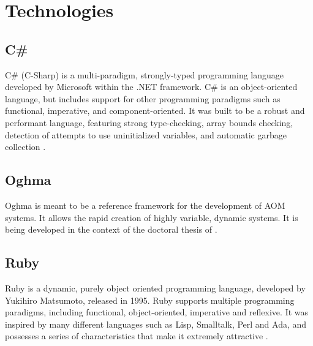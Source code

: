 \chapter{Technologies}\label{chap:technologies}

\section{C\#}\label{sec:csharp}

C\# (C-Sharp) is a multi-paradigm, strongly-typed programming language developed by Microsoft within the .NET framework. C\# is an object-oriented language, but includes support for other programming paradigms such as functional, imperative, and component-oriented. It was built to be a robust and performant language, featuring strong type-checking, array bounds checking, detection of attempts to use uninitialized variables, and automatic garbage collection \cite{csharp}.

\section{Oghma}\label{sec:oghma}


Oghma is meant to be a reference framework for the development of AOM systems. It allows the rapid creation of highly variable, dynamic systems. It is being developed in the context of the doctoral thesis of \cite{hugo_ferreira}.

\section{Ruby}\label{sec:technologies:ruby}

Ruby is a dynamic, purely object oriented programming language, developed by Yukihiro Matsumoto, released in 1995. Ruby supports multiple programming paradigms, including functional, object-oriented, imperative and reflexive. It was inspired by many different languages such as Lisp, Smalltalk, Perl and Ada, and possesses a series of characteristics that make it extremely attractive \cite{ruby}.




